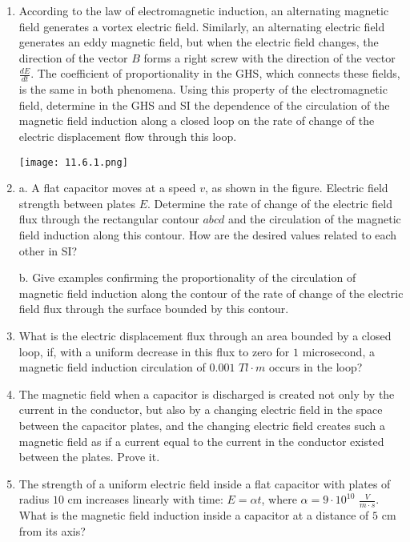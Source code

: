 \documentclass{article}
\begin{document}
\begin{enumerate}[label=11.6.\arabic*]

\item According to the law of electromagnetic induction, an alternating magnetic field generates a vortex electric field. Similarly, an alternating electric field generates an eddy magnetic field, but when the electric field changes, the direction of the vector $B$ forms a right screw with the direction of the vector $\frac{dE}{dt}$. The coefficient of proportionality in the GHS, which connects these fields, is the same in both phenomena. Using this property of the electromagnetic field, determine in the GHS and SI the dependence of the circulation of the magnetic field induction along a closed loop on the rate of change of the electric displacement flow through this loop.

\begin{center}
    \texttt{[image: 11.6.1.png]}
\end{center}


\item a. A flat capacitor moves at a speed $v$, as shown in the figure. Electric field strength between plates $E$. Determine the rate of change of the electric field flux through the rectangular contour $abcd$ and the circulation of the magnetic field induction along this contour. How are the desired values related to each other in SI? 

b. Give examples confirming the proportionality of the circulation of magnetic field induction along the contour of the rate of change of the electric field flux through the surface bounded by this contour.

\item What is the electric displacement flux through an area bounded by a closed loop, if, with a uniform decrease in this flux to zero for $1$ microsecond, a magnetic field induction circulation of $0.001$ $Tl \cdot m$ occurs in the loop?

\item The magnetic field when a capacitor is discharged is created not only by the current in the conductor, but also by a changing electric field in the space between the capacitor plates, and the changing electric field creates such a magnetic field as if a current equal to the current in the conductor existed between the plates. Prove it.

\item The strength of a uniform electric field inside a flat capacitor with plates of radius $10$ cm increases linearly with time: $E = \alpha t$, where $\alpha = 9 \cdot 10^{10}$ $\frac{V}{m \cdot s}$. What is the magnetic field induction inside a capacitor at a distance of $5$ cm from its axis?


\end{enumerate}
\end{document}
